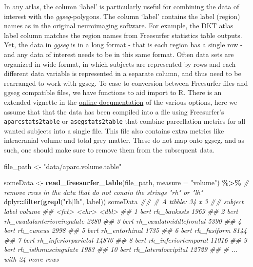 \documentclass[fleqn,10pt]{wlpeerj} %
\newenvironment{Shaded}{\begin{snugshade}}{\end{snugshade}}
\newcommand{\CommentTok}[1]{\textcolor[rgb]{0.56,0.35,0.01}{\textit{#1}}}
\newcommand{\DataTypeTok}[1]{\textcolor[rgb]{0.13,0.29,0.53}{#1}}
\newcommand{\KeywordTok}[1]{\textcolor[rgb]{0.13,0.29,0.53}{\textbf{#1}}}
\newcommand{\NormalTok}[1]{#1}
\newcommand{\OperatorTok}[1]{\textcolor[rgb]{0.81,0.36,0.00}{\textbf{#1}}}
\newcommand{\StringTok}[1]{\textcolor[rgb]{0.31,0.60,0.02}{#1}}
\begin{document}
\normalsize

In any atlas, the column `label' is particularly useful for combining the data of interest with the \emph{ggseg}-polygons.
The column `label' contains the label (region) names as in the original neuroimaging software.
For example, the DKT atlas label column matches the region names from Freesurfer statistics table outputs.
Yet, the data in \emph{ggseg} is in a long format - that is each region has a single row - and any data of interest needs to be in this same format.
Often data sets are organized in wide format, in which subjects are represented by rows and each different data variable is represented in a separate column, and thus need to be rearranged to work with ggseg.
To ease to conversion between Freesurfer files and ggseg compatible files, we have functions to aid import to R.
There is an extended vignette in the \href{}{online documentation} of the various options, here we assume that that the data has been compiled into a file using Freesurfer's \texttt{aparcstats2table} or \texttt{asegstats2table} that combine parcellation metrics for all wanted subjects into a single file.
This file also contains extra metrics like intracranial volume and total grey matter.
These do not map onto ggseg, and as such, one should make sure to remove them from the subsequent data.

\small

\begin{Shaded}
\begin{Highlighting}[]
\NormalTok{file\_path <{-}}\StringTok{ "data/aparc.volume.table"}

\NormalTok{someData <{-}}\StringTok{ }\KeywordTok{read\_freesurfer\_table}\NormalTok{(file\_path, }\DataTypeTok{measure =} \StringTok{"volume"}\NormalTok{) }\OperatorTok{\%>\%}\StringTok{ }
\StringTok{  }\CommentTok{\# remove rows in the data that do not conain the strings "rh" or "lh"}
\StringTok{  }\NormalTok{dplyr}\OperatorTok{::}\KeywordTok{filter}\NormalTok{(}\KeywordTok{grepl}\NormalTok{(}\StringTok{"rh|lh"}\NormalTok{, label))}
\NormalTok{someData}
\CommentTok{\#\# \# A tibble: 34 x 3}
\CommentTok{\#\#    subject label                      volume}
\CommentTok{\#\#    <fct>   <chr>                       <dbl>}
\CommentTok{\#\#  1 bert    rh\_bankssts                  1969}
\CommentTok{\#\#  2 bert    rh\_caudalanteriorcingulate   2280}
\CommentTok{\#\#  3 bert    rh\_caudalmiddlefrontal       5390}
\CommentTok{\#\#  4 bert    rh\_cuneus                    2998}
\CommentTok{\#\#  5 bert    rh\_entorhinal                1735}
\CommentTok{\#\#  6 bert    rh\_fusiform                  8144}
\CommentTok{\#\#  7 bert    rh\_inferiorparietal         14876}
\CommentTok{\#\#  8 bert    rh\_inferiortemporal         11016}
\CommentTok{\#\#  9 bert    rh\_isthmuscingulate          1983}
\CommentTok{\#\# 10 bert    rh\_lateraloccipital         12729}
\CommentTok{\#\# \# ... with 24 more rows}
\end{Highlighting}
\end{Shaded}
\end{document}
